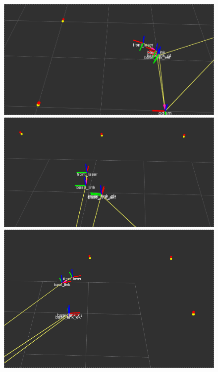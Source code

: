 \begin{figure}[!htb]
  \includegraphics[width=\linewidth]{imagenesEKF/k4/1.png}
\endminipage\hfill
{}
  \includegraphics[width=\linewidth]{imagenesEKF/k4/2.png}
\endminipage\hfill
{}%
  \includegraphics[width=\linewidth]{imagenesEKF/k4/3.png}
\endminipage
\end{figure}
\FloatBarrier

